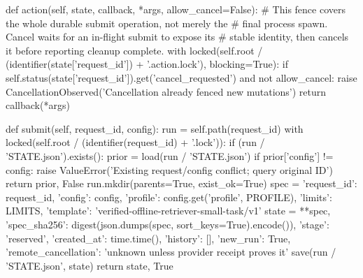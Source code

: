     def action(self, state, callback, *args, allow_cancel=False):
        # This fence covers the whole durable submit operation, not merely the
        # final process spawn. Cancel waits for an in-flight submit to expose its
        # stable identity, then cancels it before reporting cleanup complete.
        with locked(self.root / (identifier(state['request_id']) + '.action.lock'), blocking=True):
            if self.status(state['request_id']).get('cancel_requested') and not allow_cancel:
                raise CancellationObserved('Cancellation already fenced new mutations')
            return callback(*args)

    def submit(self, request_id, config):
        run = self.path(request_id)
        with locked(self.root / (identifier(request_id) + '.lock')):
            if (run / 'STATE.json').exists():
                prior = load(run / 'STATE.json')
                if prior['config'] != config:
                    raise ValueError('Existing request/config conflict; query original ID')
                return prior, False
            run.mkdir(parents=True, exist_ok=True)
            spec = {'request_id': request_id, 'config': config, 'profile': config.get('profile', PROFILE),
                    'limits': LIMITS, 'template': 'verified-offline-retriever-small-task/v1'}
            state = {**spec, 'spec_sha256': digest(json.dumps(spec, sort_keys=True).encode()),
                     'stage': 'reserved', 'created_at': time.time(), 'history': [],
                     'new_run': True, 'remote_cancellation': 'unknown unless provider receipt proves it'}
            save(run / 'STATE.json', state)
            return state, True

